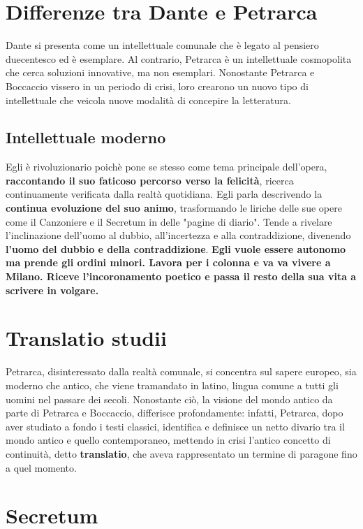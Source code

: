 \documentclass[10pt,a4paper]{article}
\begin{document}
\section{Differenze tra Dante e Petrarca}

Dante si presenta come un intellettuale comunale che è legato al pensiero duecentesco ed è esemplare. Al contrario, Petrarca è un intellettuale cosmopolita che cerca soluzioni innovative, ma non esemplari. Nonostante Petrarca e Boccaccio vissero in un periodo di crisi, loro crearono un nuovo tipo di intellettuale che veicola nuove modalità di concepire la letteratura.

\subsection{Intellettuale moderno}

Egli è rivoluzionario poichè pone se stesso come tema principale dell'opera, \textbf{raccontando il suo faticoso percorso verso la felicità}, ricerca continuamente verificata dalla realtà quotidiana.
Egli parla descrivendo la \textbf{continua evoluzione del suo animo}, trasformando le liriche delle sue opere come il Canzoniere e il Secretum in delle "pagine di diario". 
Tende a rivelare l'inclinazione dell'uomo al dubbio, all'incertezza e alla contraddizione, divenendo \textbf{l'uomo del dubbio e della contraddizione}. \textbf{Egli vuole essere autonomo ma prende gli ordini minori. Lavora per i colonna e va va vivere a Milano. Riceve l'incoronamento poetico e passa il resto della sua vita a scrivere in volgare.}

\section{Translatio studii}

Petrarca, disinteressato dalla realtà comunale, si concentra sul sapere europeo, sia moderno che antico, che viene tramandato in latino, lingua comune a tutti gli uomini nel passare dei secoli. Nonostante ciò, la visione del mondo antico da parte di Petrarca e Boccaccio, differisce profondamente: infatti, Petrarca, dopo aver studiato a fondo i testi classici, identifica e definisce un netto divario tra il mondo antico e quello contemporaneo, mettendo in crisi l'antico concetto di continuità, detto \textbf{translatio}, che aveva rappresentato un termine di paragone fino a quel momento. 

\section{Secretum}
\end{document}
